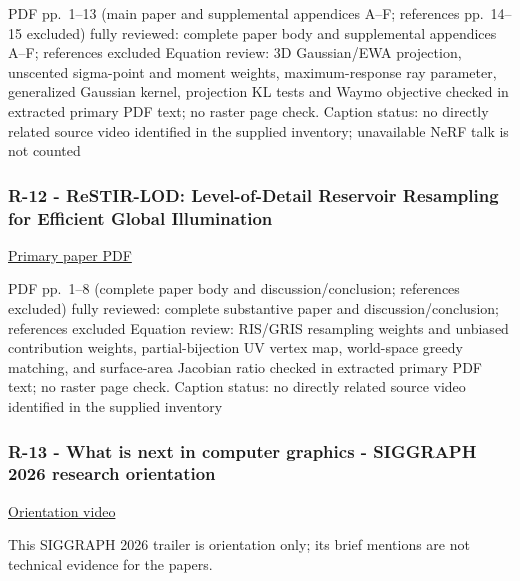 PDF pp.~1--13 (main paper and supplemental appendices A--F; references pp.~14--15 excluded) fully reviewed: complete paper body and supplemental appendices A--F; references excluded Equation review: 3D Gaussian/EWA projection, unscented sigma-point and moment weights, maximum-response ray parameter, generalized Gaussian kernel, projection KL tests and Waymo objective checked in extracted primary PDF text; no raster page check. Caption status: no directly related source video identified in the supplied inventory; unavailable NeRF talk is not counted

\subsubsection{R-12 - ReSTIR-LOD: Level-of-Detail Reservoir Resampling for Efficient Global Illumination}\label{04-visual-computing-ii-ch036-r-12---restir-lod-level-of-detail-reservoir-resampling-for-efficient-global-illumination}

\hypertarget{04-visual-computing-ii-ch036-r-12---restir-lod-level-of-detail-reservoir-resampling-for-efficient-global-illumination}{}

\href{https://research.nvidia.com/labs/rtr/publication/wang2026levelOfDetail/wang2026levelOfDetail.pdf}{Primary paper PDF}

PDF pp.~1--8 (complete paper body and discussion/conclusion; references excluded) fully reviewed: complete substantive paper and discussion/conclusion; references excluded Equation review: RIS/GRIS resampling weights and unbiased contribution weights, partial-bijection UV vertex map, world-space greedy matching, and surface-area Jacobian ratio checked in extracted primary PDF text; no raster page check. Caption status: no directly related source video identified in the supplied inventory

\subsubsection{R-13 - What is next in computer graphics - SIGGRAPH 2026 research orientation}\label{04-visual-computing-ii-ch036-r-13---what-is-next-in-computer-graphics---siggraph-2026-research-orientation}

\hypertarget{04-visual-computing-ii-ch036-r-13---what-is-next-in-computer-graphics---siggraph-2026-research-orientation}{}

\href{https://www.youtube.com/watch?v=sIcGH3M5yPc}{Orientation video}

This SIGGRAPH 2026 trailer is orientation only; its brief mentions are not technical evidence for the papers.

